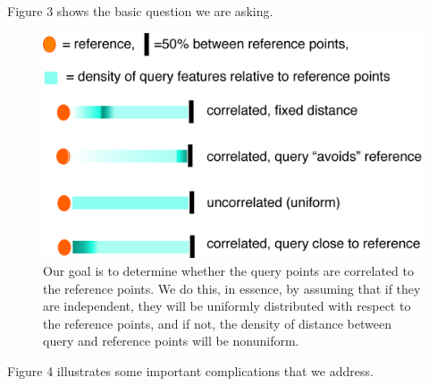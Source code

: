 \documentclass{article}
\begin{document}
Figure 3 shows the basic question we are asking.

\begin{figure}[h]
	\centering\includegraphics[scale=\picscale]{png/fig3}
	\caption{Our goal is to determine whether the query points are correlated to the reference points. We do this, in essence, by assuming that if they are independent, they will be uniformly distributed with respect to the reference points, and if not, the density of distance between query and reference points will be nonuniform.}
\end{figure}


Figure 4 illustrates some important complications that we address.
\end{document}
